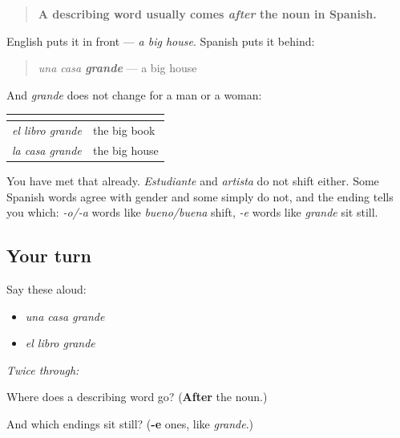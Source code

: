 \begin{grammarlens}[title={Grammar Lens: where it goes, and what it does not do}]
\begin{quote}
\textbf{A describing word usually comes \emph{after} the noun in Spanish.}
\end{quote}

English puts it in front — \emph{a big house}. Spanish puts it behind:

\begin{quote}
\emph{una casa \textbf{grande}} — a big house
\end{quote}

And \emph{grande} does not change for a man or a woman:

\noindent
\begin{tabularx}{\linewidth}{@{}>{\raggedright\arraybackslash}X>{\raggedright\arraybackslash}X@{}}
\toprule
\textbf{} & \textbf{} \\
\midrule
\emph{el libro grande} & the big book \\
\emph{la casa grande} & the big house \\
\bottomrule
\end{tabularx}

You have met that already. \emph{Estudiante} and \emph{artista} do not shift either. Some Spanish words agree with gender and some simply do not, and the ending tells you which: \emph{-o/-a} words like \emph{bueno/buena} shift, \emph{-e} words like \emph{grande} sit still.
\end{grammarlens}

\subsection*{Your turn}
Say these aloud:

\begin{itemize}
\raggedright
  \item \emph{una casa grande}
  \item \emph{el libro grande}
\end{itemize}

\emph{Twice through:}

\begin{tcolorbox}[breakable,colback=teal!4,colframe=teal!35!black,title={Before you move on}]
Where does a describing word go? (\textbf{After} the noun.)

And which endings sit still? (\textbf{-e} ones, like \emph{grande}.)
\end{tcolorbox}
